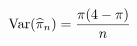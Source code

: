 \documentclass[preview]{standalone}
\begin{document}
\begin{align*}
\special{dvisvgm:raw <g id='unique000'>}\operatorname{Var}(\widehat\pi_n)=\frac{\pi(4-\pi)}{n}\special{dvisvgm:raw </g>}
\end{align*}
\end{document}
